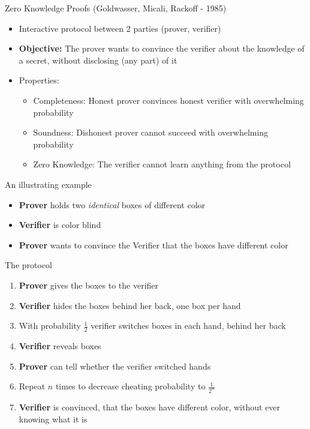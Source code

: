 \documentclass{beamer}
\begin{document}
\begin{frame}[allowframebreaks]{Zero Knowledge Proofs (Goldwasser, Micali, Rackoff - 1985)}
 \begin{itemize}
\item Interactive protocol between 2 parties (prover, verifier)
\item \textbf{Objective:} The prover wants to convince the verifier about the knowledge of a secret, without disclosing (any part) of it
\item Properties:
\begin{itemize}
\item Completeness: Honest prover convinces honest verifier with overwhelming probability
\item Soundness: Dishonest prover cannot succeed with overwhelming probability
\item Zero Knowledge: The verifier cannot learn anything from the protocol
\end{itemize} 

\end{itemize} 

\begin{block}{An illustrating example}
\begin{itemize}
\item \textbf{Prover} holds two \textit{identical} boxes of different color
\item \textbf{Verifier} is color blind
\item \textbf{Prover} wants to convince the Verifier that the boxes have different color
\end{itemize}
\end{block}

\begin{block}{The protocol}
\begin{enumerate}
\item \textbf{Prover} gives the boxes to the verifier
\item \textbf{Verifier} hides the boxes behind her back, one box per hand
\item With probability $\frac{1}{2}$ verifier switches boxes in each hand, behind her back
\item \textbf{Verifier} reveals boxes
\item \textbf{Prover} can tell whether the verifier switched hands
\item Repeat $n$ times to decrease cheating probability to $\frac{1}{2^n}$
\item \textbf{Verifier} is convinced, that the boxes have different color, without ever knowing what it is
\end{enumerate}
\end{block}


\end{frame}
\end{document}
